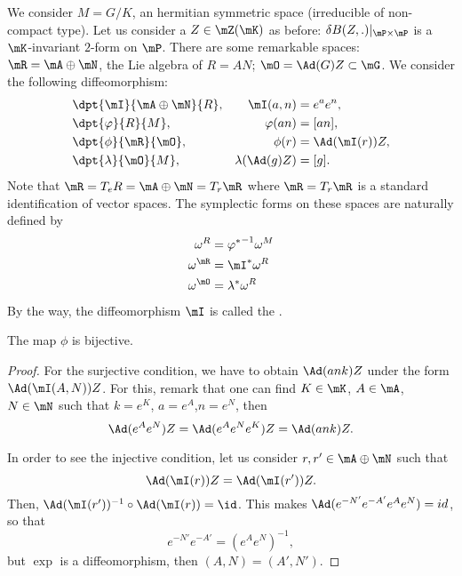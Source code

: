 We consider $M=G/K$, an hermitian symmetric space (irreducible of non-compact type). Let us consider a $Z\in\mZ(\mK)$ as before: $\delta B(Z,.)|_{\mP\times\mP}$ is a $\mK$-invariant $2$-form on $\mP$. 
There are some remarkable spaces: $\mR=\mA\oplus\mN$, the Lie algebra of $R=AN$; $\mO=\Ad(G)Z\subset\mG$. We consider the following diffeomorphism:
\begin{subequations}
\begin{align}
&\dpt{\mI}{\mA\oplus\mN}{R},  &\mI(a,n)&=e^ae^n,\\
&\dpt{\varphi}{R}{M},             &\varphi(an)&=[an],\\
&\dpt{\phi}{\mR}{\mO},        &\phi(r)&=\Ad(\mI(r))Z,\\
&\dpt{\lambda}{\mO}{M},       &\lambda(\Ad(g)Z)&=[g].
\end{align}
\end{subequations}
Note that $\mR=T_eR=\mA\oplus\mN=T_r\mR$ where $\mR=T_r\mR$ is a standard identification of vector spaces. The symplectic forms on these spaces are naturally defined by
\begin{subequations}
\begin{align}
   \omega^R&={\varphi^*}^{-1}\omega^M\\
   \omega^{\mR}&=\mI^*\omega^R\\
   \omega^{\mO}&=\lambda^*\omega^R
\end{align}
\end{subequations}
%
By the way, the diffeomorphism $\mI$ is called the .

\begin{proposition}
The map $\phi$ is bijective.
\end{proposition}

\begin{proof}
For the surjective condition, we have to obtain $\Ad(ank)Z$ under the form $\Ad(\mI(A,N))Z$. For this, remark that one can find $K\in\mK$, $A\in\mA$, $N\in\mN$  such that $k=e^K$, $a=e^A$,$n=e^N$, then
\[
  \Ad(e^Ae^N)Z=\Ad(e^Ae^Ne^K)Z=\Ad(ank)Z.
\]

In order to see the injective condition, let us consider $r,r'\in\mA\oplus\mN$ such that
\[
  \Ad(\mI(r))Z=\Ad(\mI(r'))Z.
\]
Then, $\Ad(\mI(r'))^{-1}\circ\Ad(\mI(r))=\id$. This makes $\Ad(e^{-N'}e^{-A'}e^Ae^N)=id$, so that
\[
   e^{-N'}e^{-A'}=\left(e^Ae^N\right)^{-1},
\]
but $\exp$ is a diffeomorphism, then $(A,N)=(A',N')$.

\end{proof}

